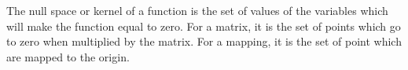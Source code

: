 The null space or kernel of a function is the set of values of the variables
which will make the function equal to zero. For a matrix, it is the set of points
which go to zero when multiplied by the matrix. For a mapping, it is the set of
point which are mapped to the origin.